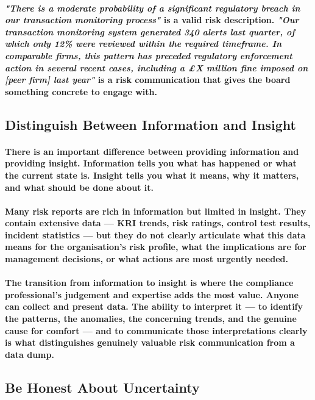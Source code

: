 \paragraph{\textit{"There is a moderate probability of a significant regulatory breach in our transaction monitoring process"} is a valid risk description. \textit{"Our transaction monitoring system generated 340 alerts last quarter, of which only 12\% were reviewed within the required timeframe. In comparable firms, this pattern has preceded regulatory enforcement action in several recent cases, including a £X million fine imposed on [peer firm] last year"} is a risk communication that gives the board something concrete to engage with.}

\subsection{Distinguish Between Information and Insight}
\paragraph{There is an important difference between providing information and providing insight. Information tells you what has happened or what the current state is. Insight tells you what it means, why it matters, and what should be done about it.}
\paragraph{Many risk reports are rich in information but limited in insight. They contain extensive data — KRI trends, risk ratings, control test results, incident statistics — but they do not clearly articulate what this data means for the organisation's risk profile, what the implications are for management decisions, or what actions are most urgently needed.}
\paragraph{The transition from information to insight is where the compliance professional's judgement and expertise adds the most value. Anyone can collect and present data. The ability to interpret it — to identify the patterns, the anomalies, the concerning trends, and the genuine cause for comfort — and to communicate those interpretations clearly is what distinguishes genuinely valuable risk communication from a data dump.}

\subsection{Be Honest About Uncertainty}
